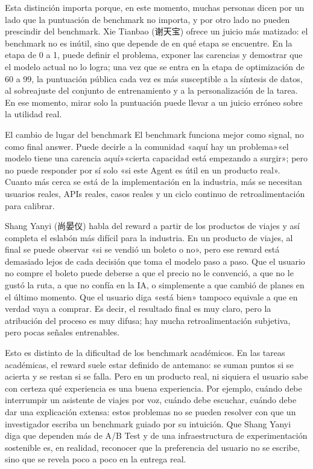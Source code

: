 \documentclass[a4paper]{article}
\begin{document}
Esta distinción importa porque, en este momento, muchas personas dicen por un lado que la puntuación de benchmark no importa, y por otro lado no pueden prescindir del benchmark. Xie Tianbao (谢天宝) ofrece un juicio más matizado: el benchmark no es inútil, sino que depende de en qué etapa se encuentre. En la etapa de 0 a 1, puede definir el problema, exponer las carencias y demostrar que el modelo actual no lo logra; una vez que se entra en la etapa de optimización de 60 a 99, la puntuación pública cada vez es más susceptible a la síntesis de datos, al sobreajuste del conjunto de entrenamiento y a la personalización de la tarea. En ese momento, mirar solo la puntuación puede llevar a un juicio erróneo sobre la utilidad real.

\begin{importantbox}{El cambio de lugar del benchmark}
El benchmark funciona mejor como signal, no como final answer. Puede decirle a la comunidad «aquí hay un problema»«el modelo tiene una carencia aquí»«cierta capacidad está empezando a surgir»; pero no puede responder por sí solo «si este Agent es útil en un producto real». Cuanto más cerca se está de la implementación en la industria, más se necesitan usuarios reales, APIs reales, casos reales y un ciclo continuo de retroalimentación para calibrar.
\end{importantbox}

Shang Yanyi (尚晏仪) habla del reward a partir de los productos de viajes y así completa el eslabón más difícil para la industria. En un producto de viajes, al final se puede observar «si se vendió un boleto o no», pero ese reward está demasiado lejos de cada decisión que toma el modelo paso a paso. Que el usuario no compre el boleto puede deberse a que el precio no le convenció, a que no le gustó la ruta, a que no confía en la IA, o simplemente a que cambió de planes en el último momento. Que el usuario diga «está bien» tampoco equivale a que en verdad vaya a comprar. Es decir, el resultado final es muy claro, pero la atribución del proceso es muy difusa; hay mucha retroalimentación subjetiva, pero pocas señales entrenables.

Esto es distinto de la dificultad de los benchmark académicos. En las tareas académicas, el reward suele estar definido de antemano: se suman puntos si se acierta y se restan si se falla. Pero en un producto real, ni siquiera el usuario sabe con certeza qué experiencia es una buena experiencia. Por ejemplo, cuándo debe interrumpir un asistente de viajes por voz, cuándo debe escuchar, cuándo debe dar una explicación extensa: estos problemas no se pueden resolver con que un investigador escriba un benchmark guiado por su intuición. Que Shang Yanyi diga que dependen más de A/B Test y de una infraestructura de experimentación sostenible es, en realidad, reconocer que la preferencia del usuario no se escribe, sino que se revela poco a poco en la entrega real.
\end{document}
